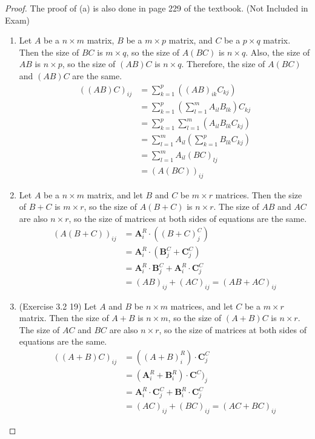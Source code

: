 \begin{proof} The proof of (a) is also done in page 229 of the textbook. (Not Included in Exam)
	\begin{enumerate}
		\item Let $A$ be a $n \times m$ matrix, $B$ be a $m \times p$ matrix, and $C$ be a $p \times q$ matrix. Then the size of $BC$ is $m \times q$, so the size of $A(BC)$ is $n \times q$. Also, the size of $AB$ is $n \times p$, so the size of $(AB)C$ is $n \times q$. Therefore, the size of $A(BC)$ and $(AB)C$ are the same.
		\begin{align*}
		((AB)C)_{ij} &= \sum_{k=1}^{p}((AB)_{ik}C_{kj}) \\
		&= \sum_{k=1}^{p}(\sum_{l=1}^{m}A_{il}B_{lk})C_{kj} \\
		&= \sum_{k=1}^{p}\sum_{l=1}^{m}(A_{il}B_{lk}C_{kj}) \\
		&= \sum_{l=1}^{m}A_{il}(\sum_{k=1}^{p}B_{lk}C_{kj}) \\
		&= \sum_{l=1}^{m}A_{il}(BC)_{lj} \\
		&= (A(BC))_{ij}
		\end{align*}
		
		\item Let $A$ be a $n \times m$ matrix, and let $B$ and $C$ be $m \times r$ matrices. Then the size of $B+C$ is $m \times r$, so the size of $A(B+C)$ is $n \times r$. The size of $AB$ and $AC$ are also $n \times r$, so the size of matrices at both sides of equations are the same.
		\begin{align*}
		(A(B+C))_{ij} &= \textbf{A}^{R}_i \cdot ((B+C)^{C}_j) \\
		&= \textbf{A}^{R}_i \cdot (\textbf{B}^{C}_j + \textbf{C}^{C}_j) \\
		&= \textbf{A}^{R}_i \cdot \textbf{B}^{C}_j + \textbf{A}^{R}_i \cdot \textbf{C}^{C}_j \\
		&= (AB)_{ij} + (AC)_{ij} = (AB+AC)_{ij}
		\end{align*}
		
		\item (Exercise 3.2 19) Let $A$ and $B$ be $n \times m$ matrices, and let $C$ be a $m \times r$ matrix. Then the size of $A+B$ is $n \times m$, so the size of $(A+B)C$ is $n \times r$. The size of $AC$ and $BC$ are also $n \times r$, so the size of matrices at both sides of equations are the same.
		\begin{align*}
		((A+B)C)_{ij} &= ((A+B)^{R}_i) \cdot \textbf{C}^{C}_j \\
		&= (\textbf{A}^{R}_i + \textbf{B}^{R}_i) \cdot \textbf{C}^{C})_j \\
		&= \textbf{A}^{R}_i \cdot \textbf{C}^{C}_j + \textbf{B}^{R}_i \cdot \textbf{C}^{C}_j \\
		&= (AC)_{ij} + (BC)_{ij} = (AC+BC)_{ij} 
		\end{align*}
		

\end{enumerate}
\end{proof}
